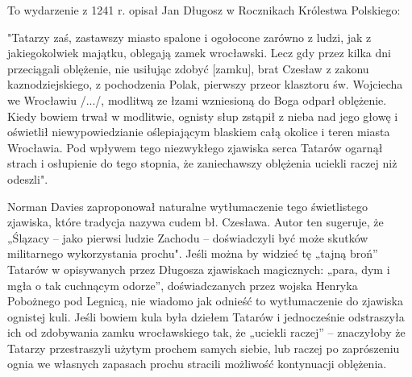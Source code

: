 \documentclass{article}
\begin{document}
To wydarzenie z 1241 r. opisał Jan Długosz w Rocznikach Królestwa Polskiego:

"Tatarzy zaś, zastawszy miasto spalone i ogołocone zarówno z ludzi, jak z jakiegokolwiek majątku, oblegają zamek wrocławski. Lecz gdy przez kilka dni przeciągali oblężenie, nie usiłując zdobyć [zamku], brat Czesław z zakonu kaznodziejskiego, z pochodzenia Polak, pierwszy przeor klasztoru św. Wojciecha we Wrocławiu /.../, modlitwą ze łzami wzniesioną do Boga odparł oblężenie. Kiedy bowiem trwał w modlitwie, ognisty słup zstąpił z nieba nad jego głowę i oświetlił niewypowiedzianie oślepiającym blaskiem całą okolice i teren miasta Wrocławia. Pod wpływem tego niezwykłego zjawiska serca Tatarów ogarnął strach i osłupienie do tego stopnia, że zaniechawszy oblężenia uciekli raczej niż odeszli".

Norman Davies zaproponował naturalne wytłumaczenie tego świetlistego zjawiska, które tradycja nazywa cudem bł. Czesława. Autor ten sugeruje, że „Ślązacy – jako pierwsi ludzie Zachodu – doświadczyli być może skutków militarnego wykorzystania prochu". Jeśli można by widzieć tę „tajną broń” Tatarów w opisywanych przez Długosza zjawiskach magicznych: „para, dym i mgła o tak cuchnącym odorze”, doświadczanych przez wojska Henryka Pobożnego pod Legnicą, nie wiadomo jak odnieść to wytłumaczenie do zjawiska ognistej kuli. Jeśli bowiem kula była dziełem Tatarów i jednocześnie odstraszyła ich od zdobywania zamku wrocławskiego tak, że „uciekli raczej” – znaczyłoby że Tatarzy przestraszyli użytym prochem samych siebie, lub raczej po zaprószeniu ognia we własnych zapasach prochu stracili możliwość kontynuacji oblężenia.
\end{document}
